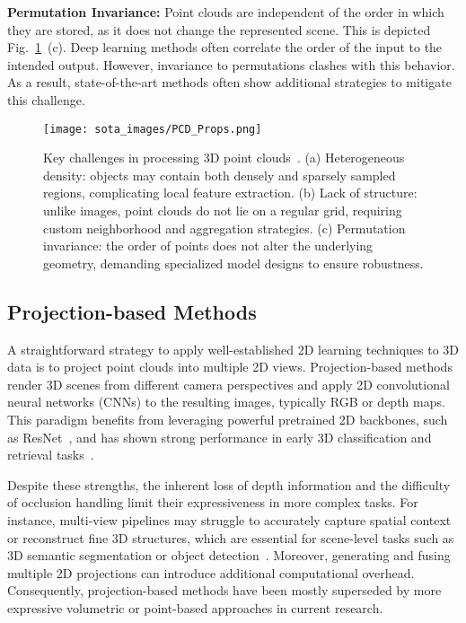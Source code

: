 \textbf{Permutation Invariance:} Point clouds are independent of the order
in which they are stored, as it does not change the represented scene.
This is depicted Fig.~\ref{fig:pcd_props}~(c).
Deep learning methods often correlate the order of the input to the
intended output. However, invariance to permutations clashes with this
behavior. As a result, state-of-the-art methods often show additional
strategies to mitigate this challenge.

\begin{figure}[t]
    \centering
    \texttt{[image: sota\_images/PCD\_Props.png]}
    \caption[Key challenges in processing 3D point clouds]
            {Key challenges in processing 3D point clouds~\cite{bello2020deep}.
        (a) Heterogeneous density: objects may contain both densely and sparsely sampled regions,
        complicating local feature extraction.
        (b) Lack of structure: unlike images, point clouds do not lie on a regular grid,
        requiring custom neighborhood and aggregation strategies.
        (c) Permutation invariance: the order of points does not alter the underlying geometry,
        demanding specialized model designs to ensure robustness.}\label{fig:pcd_props}
\end{figure}

\subsection{Projection-based Methods}
A straightforward strategy to apply well-established 2D learning techniques to
3D data is to project point clouds into multiple 2D views.
%
Projection-based methods render 3D scenes from different camera perspectives
and apply 2D convolutional neural networks (CNNs) to the resulting images,
typically RGB or depth maps. This paradigm benefits from leveraging powerful
pretrained 2D backbones, such as ResNet~\cite{he2015deep}, and has shown strong
performance in early 3D classification and retrieval
tasks~\cite{su2015multi,feng2018gvcnn,yang2019learning,lawin2017deep,lyu2020learning}.
%

Despite these strengths, the inherent loss of depth information and the
difficulty of occlusion handling limit their expressiveness in more complex
tasks. For instance, multi-view pipelines may struggle to accurately capture
spatial context or reconstruct fine 3D structures, which are essential for
scene-level tasks such as 3D semantic segmentation or object
detection~\cite{guo2020deep}.
%
Moreover, generating and fusing multiple 2D projections can introduce
additional computational overhead.
%
Consequently, projection-based methods have been mostly superseded by more
expressive volumetric or point-based approaches in current research.

